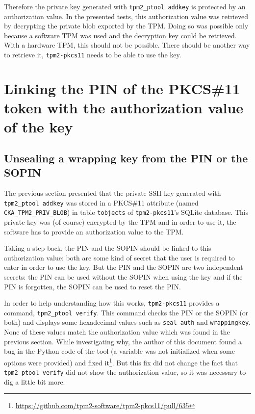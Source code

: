 Therefore the private key generated with
\texttt{tpm2\_ptool addkey} is protected by an
authorization value. In the presented tests, this authorization value
was retrieved by decrypting the private blob exported by the TPM. Doing
so was possible only because a software TPM was used and the decryption
key could be retrieved. With a hardware TPM, this should not be
possible. There should be another way to retrieve it,
\texttt{tpm2-pkcs11} needs to be able to use the key.

\section{Linking the PIN of the PKCS\#11 token with the authorization
value of the key}

\subsection{Unsealing a wrapping key from the PIN or the SOPIN}

The previous section presented that the private SSH key generated with
\texttt{tpm2\_ptool addkey} was stored in a PKCS\#11
attribute (named \texttt{CKA\_TPM2\_PRIV\_BLOB}) in
table \texttt{tobjects} of
\texttt{tpm2-pkcs11}'s SQLite database. This private
key was (of course) encrypted by the TPM and in order to use it, the
software has to provide an authorization value to the TPM.

Taking a step back, the PIN and the SOPIN should be linked to this
authorization value: both are some kind of secret that the user is
required to enter in order to use the key. But the PIN and the SOPIN are
two independent secrets: the PIN can be used without the SOPIN when
using the key and if the PIN is forgotten, the SOPIN can be used to
reset the PIN.

In order to help understanding how this works,
\texttt{tpm2-pkcs11} provides a command,
\texttt{tpm2\_ptool verify}. This command checks the
PIN or the SOPIN (or both) and displays some hexadecimal values such as
\texttt{seal-auth} and
\texttt{wrappingkey}. None of these values match the
authorization value which was found in the previous section. While
investigating why, the author of this document found a bug in the Python
code of the tool (a variable was not initialized when some options were
provided) and fixed it\footnote{\url{https://github.com/tpm2-software/tpm2-pkcs11/pull/635}}.
But this fix did not change the fact that
\texttt{tpm2\_ptool verify} did not show the
authorization value, so it was necessary to dig a little bit more.


